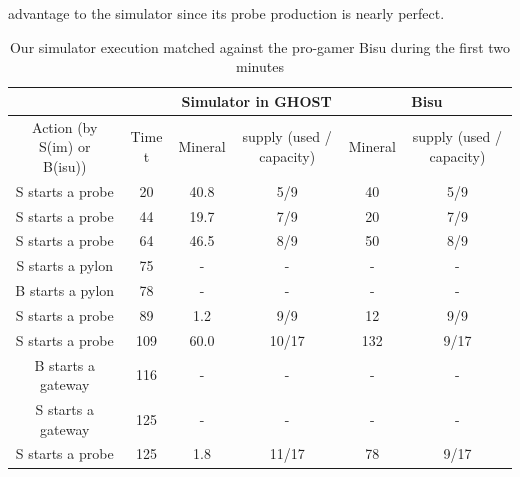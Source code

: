 \documentclass[journal]{IEEEtran}
\newcommand{\ghost}{\textsc{GHOST}\xspace}
\begin{document}
advantage  to  the simulator  since  its  probe production  is  nearly
perfect.
\begin{table}[ht]
  \caption{Our simulator execution matched  against the pro-gamer Bisu
    during the first two minutes}
  \label{tab:korean}
  \centering
  \begin{tabular}{|c|c|c|c|c|c|} 
    \cline{3-6}
    \multicolumn{2}{c|}{} & \multicolumn{2}{c|}{Simulator in \ghost} & \multicolumn{2}{c|}{Bisu}\\ 
    \hline
    Action (by S(im) or B(isu)) & Time t & \multicolumn{1}{c|}{Mineral} & \multicolumn{1}{c|}{supply (used / capacity)} & \multicolumn{1}{c|}{Mineral} & \multicolumn{1}{c|}{supply (used / capacity)}\\
    \hline
    S starts a probe & 20 & 40.8 & 5/9 & 40 & 5/9\\
    S starts a probe & 44 & 19.7 & 7/9 & 20 & 7/9\\
    S starts a probe & 64 & 46.5 & 8/9 & 50 & 8/9\\
    S starts a pylon & 75 & - & - & - & -\\
    B starts a pylon & 78 & - & - & - & -\\
    S starts a probe & 89 & 1.2 & 9/9 & 12 & 9/9\\
    S starts a probe & 109 & 60.0 & 10/17 & 132 & 9/17\\
    B starts a gateway & 116 & - & - & - & -\\
    S starts a gateway & 125 & - & - & - & -\\
    S starts a probe & 125 & 1.8 & 11/17 & 78 & 9/17\\
    \hline    
  \end{tabular}
\end{table}
\end{document}
